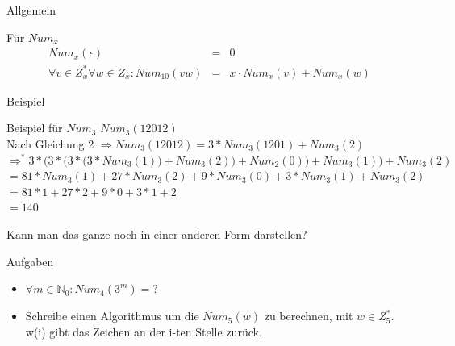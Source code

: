 	
	\begin{frame}{Allgemein}
		\begin{block}{Für $Num_x$}
			\begin{align}
			Num_{x}(\epsilon) &=& 0 \\
			\forall v \in Z_{x}^*\forall w \in Z_{x} : Num_{10}(vw) 
			&=& x \cdot Num_{x}(v) + Num_{x}(w)
			\end{align}
		\end{block}
	\end{frame}
	
		
	
	\begin{frame}{Beispiel}
		\begin{block}{Beispiel für $Num_3$}
			$Num_3(12012)$\\
		\pause
			Nach Gleichung 2 $\Rightarrow Num_3(12012) = 3*Num_3(1201) + Num_3(2)$\\
		\pause
			$\Rightarrow^* 3*\bigg(3*\Big(3*\big(3*Num_3(1) )+Num_3(2)\big)+ Num_2(0)\Big)+Num_3(1)\bigg) + Num_3(2) $\\
		\pause
			\vspace{5pt}
			$= 81* Num_3(1) + 27* Num_3(2) + 9* Num_3(0) + 3* Num_3(1) + Num_3(2)$\\
		\pause
			\vspace{5pt}
			$ = 81* 1 + 27* 2 + 9 * 0 + 3 * 1 + 2$\\
		\pause
			\vspace{5pt}
			$ = 140$
		\end{block}
		
		\pause
		Kann man das ganze noch in einer anderen Form darstellen?
	\end{frame}
	
	
	\begin{frame}{Aufgaben}
		\begin{itemize}
			\item $\forall m \in \mathbb{N}_0 : Num_4({3}^m) = ?$\\
				\visible<2->{
					\color{darkgreen} 
					$4^m - 1$ 
					\color{black}}
					\pause
			\item Schreibe einen Algorithmus um die $Num_5(w)$ zu berechnen, 
			mit $w \in Z_5^*$. \\
			w(i) gibt das Zeichen an der i-ten Stelle zurück.
		\end{itemize}
	\end{frame}
	
	
	
